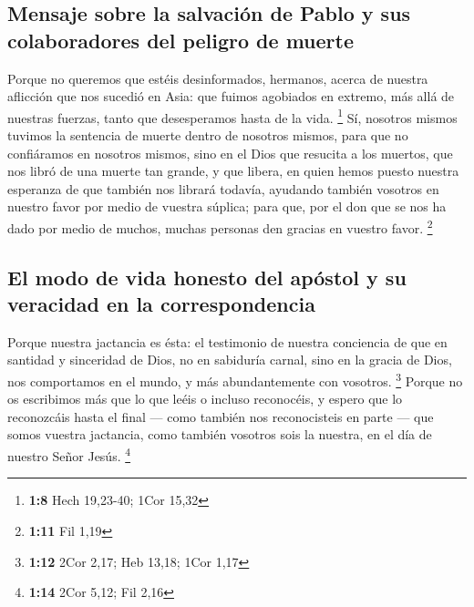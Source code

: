 \begin{paracol}{2}
\hypertarget{mensaje-sobre-la-salvaciuxf3n-de-pablo-y-sus-colaboradores-del-peligro-de-muerte}{%
\subsection{Mensaje sobre la salvación de Pablo y sus colaboradores del
peligro de
muerte}\label{mensaje-sobre-la-salvaciuxf3n-de-pablo-y-sus-colaboradores-del-peligro-de-muerte}}

 Porque no queremos que estéis desinformados, hermanos,
acerca de nuestra aflicción que nos sucedió en Asia: que fuimos
agobiados en extremo, más allá de nuestras fuerzas, tanto que
desesperamos hasta de la vida. \footnote{\textbf{1:8} Hech 19,23-40;
  1Cor 15,32}  Sí, nosotros mismos tuvimos la sentencia de
muerte dentro de nosotros mismos, para que no confiáramos en nosotros
mismos, sino en el Dios que resucita a los muertos,  que
nos libró de una muerte tan grande, y que libera, en quien hemos puesto
nuestra esperanza de que también nos librará todavía, 
ayudando también vosotros en nuestro favor por medio de vuestra súplica;
para que, por el don que se nos ha dado por medio de muchos, muchas
personas den gracias en vuestro favor. \footnote{\textbf{1:11} Fil 1,19}

\hypertarget{el-modo-de-vida-honesto-del-apuxf3stol-y-su-veracidad-en-la-correspondencia}{%
\subsection{El modo de vida honesto del apóstol y su veracidad en la
correspondencia}\label{el-modo-de-vida-honesto-del-apuxf3stol-y-su-veracidad-en-la-correspondencia}}

 Porque nuestra jactancia es ésta: el testimonio de
nuestra conciencia de que en santidad y sinceridad de Dios, no en
sabiduría carnal, sino en la gracia de Dios, nos comportamos en el
mundo, y más abundantemente con vosotros. \footnote{\textbf{1:12} 2Cor
  2,17; Heb 13,18; 1Cor 1,17}  Porque no os escribimos
más que lo que leéis o incluso reconocéis, y espero que lo reconozcáis
hasta el final ---  como también nos reconocisteis en
parte --- que somos vuestra jactancia, como también vosotros sois la
nuestra, en el día de nuestro Señor Jesús. \footnote{\textbf{1:14} 2Cor
  5,12; Fil 2,16}

\hypertarget{el-relato-del-apuxf3stol-del-cambio-en-sus-planes-de-viaje-indicaciuxf3n-de-su-fiabilidad-como-apuxf3stol-de-cristo-y-de-dios-fiel}{%
}
\end{paracol}
